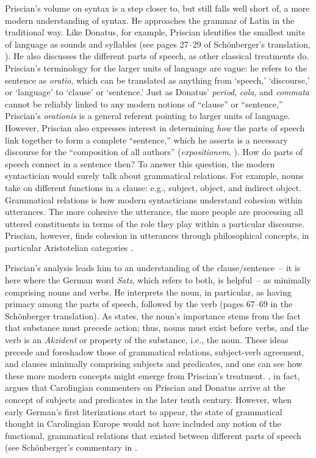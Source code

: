 Priscian’s volume on syntax is a step closer to, but still falls well short of, a more modern understanding of syntax. He approaches the grammar of Latin in the traditional way. Like Donatus, for example, Priscian identifies the smallest units of language as sounds and syllables (see pages 27--29 of Schönberger’s translation, \citealt{Priscian2010}). He also discusses the different parts of speech, as other classical treatments do. Priscian’s terminology for the larger units of language are vague: he refers to the sentence as \textit{oratio}, which can be translated as anything from ‘speech,’ ‘discourse,’ or ‘language’ to ‘clause’ or ‘sentence.’ Just as Donatus’ \textit{period}, \textit{cola}, and \textit{commata} cannot be reliably linked to any modern notions of “clause” or “sentence,” Priscian’s \textit{orationis} is a general referent pointing to larger units of language. However, Priscian also expresses interest in determining \textit{how} the parts of speech link together to form a complete “sentence,” which he asserts is a necessary discourse for the “composition of all authors” (\textit{expositionem}, \citealt[27]{Schönberger2010}). How do parts of speech connect in a sentence then? To answer this question, the modern syntactician would surely talk about grammatical relations. For example, nouns take on different functions in a clause: e.g., subject, object, and indirect object. Grammatical relations is how modern syntacticians understand cohesion within utterances. The more cohesive the utterance, the more people are processing all uttered constituents in terms of the role they play within a particular discourse. Priscian, however, finds cohesion in utterances through philosophical concepts, in particular Aristotelian categories \citep[146]{Luhtala1993}.

  Priscian’s analysis leads him to an understanding of the clause/sentence~-- it is here where the German word \textit{Satz}, which refers to both, is helpful~-- as minimally comprising nouns and verbs. He interprets the noun, in particular, as having primacy among the parts of speech, followed by the verb (pages 67--69 in the Schönberger translation). As \citet[146--147]{Luhtala1993} states, the noun’s importance stems from the fact that substance must precede action; thus, nouns must exist before verbs, and the verb is an \textit{Akzident} or property of the substance, i.e., the noun. These ideas precede and foreshadow those of grammatical relations, subject-verb agreement, and clauses minimally comprising subjects and predicates, and one can see how these more modern concepts might emerge from Priscian’s treatment. \citet{Luhthala1993}, in fact, argues that Carolingian commenters on Priscian and Donatus arrive at the concept of subjects and predicates in the later tenth century. However, when early German’s first literizations start to appear, the state of grammatical thought in Carolingian Europe would not have included any notion of the functional, grammatical relations that existed between different parts of speech (see Schönberger's commentary in \citet[495]{Schönberger2010}.

